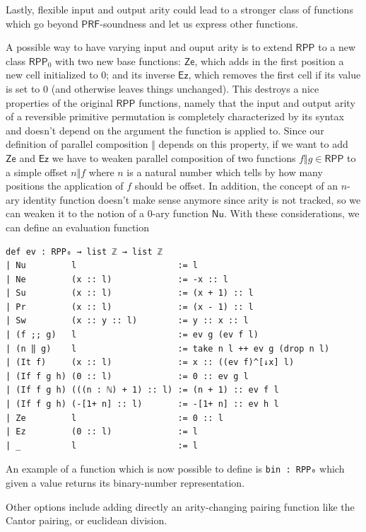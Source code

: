 \documentclass[oneside]{book}
\theoremstyle{definition}
\theoremstyle{remark}
\theoremstyle{plain}
\newcommand{\RPP}{\mathsf{RPP}}
\newcommand{\rppPa}{\Vert}
\newcommand{\rppNu}{\mathsf{Nu}}
\newcommand{\rppZe}{\mathsf{Ze}}
\newcommand{\rppEz}{\mathsf{Ez}}
\newcommand{\PRF}{\mathsf{PRF}}
\begin{document}
Lastly, flexible input and output arity could lead to a stronger class of functions which
go beyond $\PRF$-soundness and let us express other functions.

A possible way to have varying input and ouput arity is to extend $\RPP$ to a new class $\RPP_0$ with two new base functions:
$\rppZe$, which adds in the first position a new cell initialized to $0$;
and its inverse $\rppEz$, which removes the first cell if its value is set to $0$ (and otherwise leaves things unchanged).
This destroys a nice properties of the original $\RPP$ functions,
namely that the input and output arity of a reversible primitive permutation is completely characterized by its syntax
and doesn't depend on the argument the function is applied to.
Since our definition of parallel composition $\rppPa$ depends on this property, if we want to add $\rppZe$ and $\rppEz$
we have to weaken parallel composition of two functions $f \rppPa g \in \RPP$ to a simple offset $n \rppPa f$
where $n$ is a natural number which tells by how many positions the application of $f$ should be offset.
In addition, the concept of an $n$-ary identity function doesn't make sense anymore
since arity is not tracked, so we can weaken it to the notion of a $0$-ary function $\rppNu$.
With these considerations, we can define an evaluation function
\begin{lstlisting}
def ev : RPP₀ → list ℤ → list ℤ
| Nu         l                    := l
| Ne         (x :: l)             := -x :: l
| Su         (x :: l)             := (x + 1) :: l
| Pr         (x :: l)             := (x - 1) :: l
| Sw         (x :: y :: l)        := y :: x :: l
| (f ;; g)   l                    := ev g (ev f l)
| (n ‖ g)    l                    := take n l ++ ev g (drop n l)
| (It f)     (x :: l)             := x :: ((ev f)^[↓x] l)
| (If f g h) (0 :: l)             := 0 :: ev g l
| (If f g h) (((n : ℕ) + 1) :: l) := (n + 1) :: ev f l
| (If f g h) (-[1+ n] :: l)       := -[1+ n] :: ev h l
| Ze         l                    := 0 :: l
| Ez         (0 :: l)             := l
| _          l                    := l
\end{lstlisting}
An example of a function which is now possible to define is \lstinline{bin : RPP₀} which
given a value returns its binary-number representation.

Other options include adding directly an arity-changing pairing function like the Cantor pairing,
or euclidean division.

\paragraph{}
\end{document}

